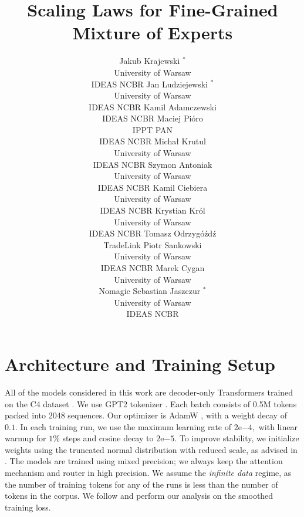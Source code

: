 \documentclass{article} %
\title{Scaling Laws for Fine-Grained\\ Mixture of Experts
}
\author{Jakub Krajewski $^{\ast}$ \\ University of Warsaw \\ IDEAS NCBR \And Jan Ludziejewski $^{\ast}$ \\ University of Warsaw \\ IDEAS NCBR
 \And Kamil Adamczewski \\ IDEAS NCBR  \And Maciej Pióro\hspace{1.1cm} \\ IPPT PAN \\ IDEAS NCBR \AND Michał Krutul \\ University of Warsaw \\ IDEAS NCBR \And Szymon Antoniak \\ University of Warsaw \\ IDEAS NCBR \And Kamil Ciebiera \\ University of Warsaw \\ IDEAS NCBR \And Krystian Król \\ University of Warsaw \\ IDEAS NCBR \AND Tomasz Odrzygóźdź \\ TradeLink \And Piotr Sankowski \\ University of Warsaw \\ IDEAS NCBR \And Marek Cygan \\ University of Warsaw \\ Nomagic \And Sebastian Jaszczur $^{\ast}$ \\ University of Warsaw \\ IDEAS NCBR
}
\theoremstyle{plain}
\theoremstyle{definition}
\theoremstyle{remark}
\begin{document}
\maketitle



% 





















\appendix

\clearpage
\appendix
\onecolumn
\section{Architecture and Training Setup}\label{app:setup}
All of the models considered in this work are decoder-only Transformers trained on the C4 dataset \citep{raffel2023exploring}. We use GPT2 tokenizer \citep{radford2018improving}. Each batch consists of 0.5M tokens packed into 2048 sequences. Our optimizer is AdamW \citep{loshchilov2019decoupled}, with a weight decay of $0.1.$ In each training run, we use the maximum learning rate of $2\mathrm{e}{-4},$ with linear warmup for $1\%$ steps and cosine decay to $2\mathrm{e}{-5}.$ To improve stability, we initialize weights using the truncated normal distribution with reduced scale, as advised in \cite{fedus2022switch}. The models are trained using mixed precision; we always keep the attention mechanism and router in high precision. We assume the \textit{infinite data} regime, as the number of training tokens for any of the runs is less than the number of tokens in the corpus. We follow \cite{hoffmann2022training} and perform our analysis on the smoothed training loss.
\end{document}
